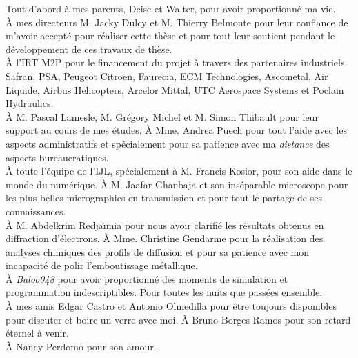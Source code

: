 \def\skipaknow{12pt}
\begin{flushright}
\vfill{}

Tout d'abord à mes parents, Deise et Walter, pour avoir proportionné ma vie.\\[\skipaknow]
	
À mes directeurs M. Jacky Dulcy et M. Thierry Belmonte pour leur confiance de m'avoir accepté pour réaliser cette thèse et pour tout leur soutient pendant le développement de ces travaux de thèse.\\[\skipaknow]

À l'IRT M2P pour le financement du projet à travers des partenaires industriels Safran, PSA, Peugeot Citroën, Faurecia, ECM Technologies, Ascometal, Air Liquide, Airbus Helicopters, Arcelor Mittal, UTC Aerospace Systems et Poclain Hydraulics.\\[\skipaknow]

À M. Pascal Lamesle, M. Grégory Michel et M. Simon Thibault pour leur support au cours de mes études. À Mme. Andrea Puech pour tout l'aide avec les aspects administratifs et spécialement pour sa patience avec ma \emph{distance} des aspects bureaucratiques.\\[\skipaknow]

À toute l'équipe de l'IJL, spécialement à M. Francis Kosior, pour son aide dans le monde du numérique. À M. Jaafar Ghanbaja et son inséparable microscope pour les plus belles micrographies en transmission et pour tout le partage de ses connaissances.\\[\skipaknow]

À M. Abdelkrim Redjaïmia pour nous avoir clarifié les résultats obtenus en diffraction d'électrons. À Mme. Christine Gendarme pour la réalisation des analyses chimiques des profils de diffusion et pour sa patience avec mon incapacité de polir l'emboutissage métallique.\\[\skipaknow]

À \emph{Baloo048} pour avoir proportionné des moments de simulation et programmation indescriptibles. Pour toutes les nuits que passées ensemble.\\[\skipaknow]

À mes amis Edgar Castro et Antonio Olmedilla pour être toujours disponibles pour discuter et boire un verre avec moi. À Bruno Borges Ramos pour son retard éternel à venir.\\[\skipaknow]


À Nancy Perdomo pour son amour.
\vfill{}
\end{flushright}

